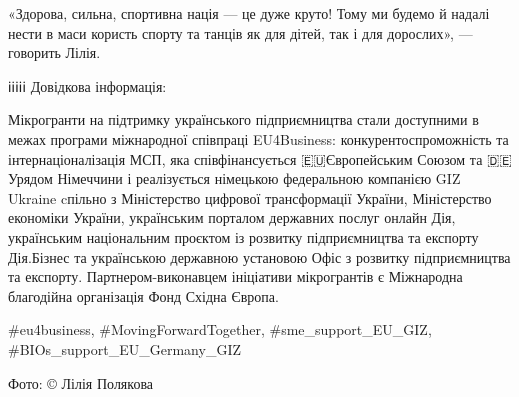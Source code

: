«Здорова, сильна, спортивна нація — це дуже круто! Тому ми будемо й надалі
нести в маси користь спорту та танців як для дітей, так і для дорослих», —
говорить Лілія.

ℹ️ℹ️ℹ️ℹ️ℹ️ Довідкова інформація:

Мікрогранти на підтримку українського підприємництва стали доступними в межах
програми міжнародної співпраці EU4Business: конкурентоспроможність та
інтернаціоналізація МСП, яка співфінансується 🇪🇺Європейським Союзом та
🇩🇪Урядом Німеччини і реалізується німецькою федеральною компанією GIZ Ukraine
cпільно з Міністерство цифрової трансформації України, Міністерство економіки
України, українським порталом державних послуг онлайн Дія, українським
національним проєктом із розвитку підприємництва та експорту Дія.Бізнес та
українською державною установою Офіс з розвитку підприємництва та експорту.
Партнером-виконавцем ініціативи мікрогрантів є Міжнародна благодійна
організація Фонд Східна Європа.

\#eu4business, \#MovingForwardTogether, \#sme\_support\_EU\_GIZ,
\#BIOs\_support\_EU\_Germany\_GIZ

Фото: © Лілія Полякова

